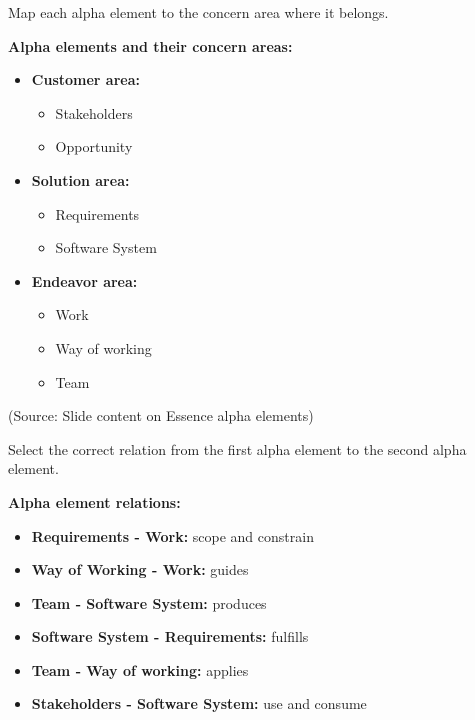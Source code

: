 \documentclass[12pt]{article}
\begin{document}
\begin{questionbox}
Map each alpha element to the concern area where it belongs.
\end{questionbox}

\textbf{Alpha elements and their concern areas:}

\begin{itemize}
    \item \textbf{Customer area:}
    \begin{itemize}
        \item Stakeholders
        \item Opportunity
    \end{itemize}
    \item \textbf{Solution area:}
    \begin{itemize}
        \item Requirements
        \item Software System
    \end{itemize}
    \item \textbf{Endeavor area:}
    \begin{itemize}
        \item Work
        \item Way of working
        \item Team
    \end{itemize}
\end{itemize}

(Source: Slide content on Essence alpha elements)

\begin{questionbox}
Select the correct relation from the first alpha element to the second alpha element.
\end{questionbox}

\textbf{Alpha element relations:}

\begin{itemize}
    \item \textbf{Requirements - Work:} scope and constrain
    \item \textbf{Way of Working - Work:} guides
    \item \textbf{Team - Software System:} produces
    \item \textbf{Software System - Requirements:} fulfills
    \item \textbf{Team - Way of working:} applies
    \item \textbf{Stakeholders - Software System:} use and consume
\end{itemize}
\end{document}
